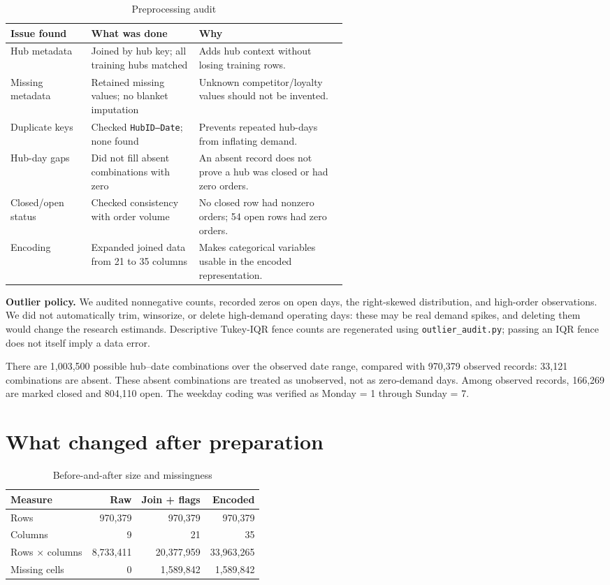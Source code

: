 \documentclass[10pt,a4paper,twocolumn]{article}
\begin{document}
\begin{table}[t]
\centering
\caption{Preprocessing audit}
\label{tab:prep}
\scriptsize
\begin{tabularx}{\linewidth}{@{}p{0.24\linewidth}p{0.32\linewidth}X@{}}
\toprule
Issue found & What was done & Why\\
\midrule
Hub metadata & Joined by hub key; all training hubs matched & Adds hub context without losing training rows.\\
Missing metadata & Retained missing values; no blanket imputation & Unknown competitor/loyalty values should not be invented.\\
Duplicate keys & Checked \texttt{HubID--Date}; none found & Prevents repeated hub-days from inflating demand.\\
Hub-day gaps & Did not fill absent combinations with zero & An absent record does not prove a hub was closed or had zero orders.\\
Closed/open status & Checked consistency with order volume & No closed row had nonzero orders; 54 open rows had zero orders.\\
Encoding & Expanded joined data from 21 to 35 columns & Makes categorical variables usable in the encoded representation.\\
\bottomrule
\end{tabularx}
\end{table}

\textbf{Outlier policy.} We audited nonnegative counts, recorded zeros on open days, the right-skewed distribution, and high-order observations. We did not automatically trim, winsorize, or delete high-demand operating days: these may be real demand spikes, and deleting them would change the research estimands. Descriptive Tukey-IQR fence counts are regenerated using \texttt{outlier\_audit.py}; passing an IQR fence does not itself imply a data error. 

There are 1,003,500 possible hub--date combinations over the observed date range, compared with 970,379 observed records: 33,121 combinations are absent. These absent combinations are treated as unobserved, not as zero-demand days. Among observed records, 166,269 are marked closed and 804,110 open. The weekday coding was verified as Monday = 1 through Sunday = 7.

\section{What changed after preparation}
\begin{table}[t]
\centering
\caption{Before-and-after size and missingness}
\label{tab:beforeafter}
\scriptsize
\begin{tabular}{lrrr}
\toprule
Measure & Raw & Join + flags & Encoded\\
\midrule
Rows & 970,379 & 970,379 & 970,379\\
Columns & 9 & 21 & 35\\
Rows $\times$ columns & 8,733,411 & 20,377,959 & 33,963,265\\
Missing cells & 0 & 1,589,842 & 1,589,842\\
\bottomrule
\end{tabular}
\end{table}
\end{document}
